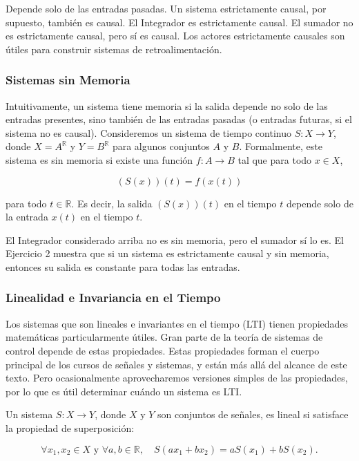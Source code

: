 \documentclass[12pt,a4paper]{article}
\begin{document}
Depende solo de las entradas pasadas. Un sistema estrictamente causal, por supuesto, también es causal. El Integrador es estrictamente causal. El sumador no es estrictamente causal, pero sí es causal. Los actores estrictamente causales son útiles para construir sistemas de retroalimentación.

\subsubsection{Sistemas sin Memoria}

Intuitivamente, un sistema tiene memoria si la salida depende no solo de las entradas presentes, sino también de las entradas pasadas (o entradas futuras, si el sistema no es causal). Consideremos un sistema de tiempo continuo $S : X \rightarrow Y$, donde $X = A^{\mathbb{R}}$ y $Y = B^{\mathbb{R}}$ para algunos conjuntos $A$ y $B$. Formalmente,
este sistema es sin memoria si existe una función $f : A \rightarrow B$ tal que para todo $x \in X$,

\[
(S(x))(t) = f(x(t))
\]

para todo $t \in \mathbb{R}$. Es decir, la salida $(S(x))(t)$ en el tiempo $t$ depende solo de la entrada $x(t)$ en el tiempo $t$.

El Integrador considerado arriba no es sin memoria, pero el sumador sí lo es. El Ejercicio 2 muestra que si un sistema es estrictamente causal y sin memoria, entonces su salida es constante para todas las entradas.

\subsubsection{Linealidad e Invariancia en el Tiempo}

Los sistemas que son lineales e invariantes en el tiempo (LTI) tienen propiedades matemáticas particularmente útiles. Gran parte de la teoría de sistemas de control depende de estas propiedades. Estas propiedades forman el cuerpo principal de los cursos de señales y sistemas, y están más allá del alcance de este texto. Pero ocasionalmente aprovecharemos versiones simples de las propiedades, por lo que es útil determinar cuándo un sistema es LTI.

Un sistema $S : X \rightarrow Y$, donde $X$ y $Y$ son conjuntos de señales, es lineal si satisface la propiedad de superposición:

\[
\forall x_1, x_2 \in X \text{ y } \forall a, b \in \mathbb{R}, \quad S(ax_1 + bx_2) = aS(x_1) + bS(x_2).
\]
\end{document}
